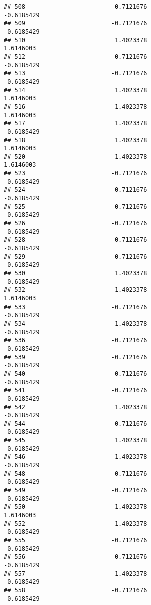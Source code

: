 \documentclass[
]{article}
\begin{document}
\begin{verbatim}
## 508                        -0.7121676                       -0.6185429
## 509                        -0.7121676                       -0.6185429
## 510                         1.4023378                        1.6146003
## 512                        -0.7121676                       -0.6185429
## 513                        -0.7121676                       -0.6185429
## 514                         1.4023378                        1.6146003
## 516                         1.4023378                        1.6146003
## 517                         1.4023378                       -0.6185429
## 518                         1.4023378                        1.6146003
## 520                         1.4023378                        1.6146003
## 523                        -0.7121676                       -0.6185429
## 524                        -0.7121676                       -0.6185429
## 525                        -0.7121676                       -0.6185429
## 526                        -0.7121676                       -0.6185429
## 528                        -0.7121676                       -0.6185429
## 529                        -0.7121676                       -0.6185429
## 530                         1.4023378                       -0.6185429
## 532                         1.4023378                        1.6146003
## 533                        -0.7121676                       -0.6185429
## 534                         1.4023378                       -0.6185429
## 536                        -0.7121676                       -0.6185429
## 539                        -0.7121676                       -0.6185429
## 540                        -0.7121676                       -0.6185429
## 541                        -0.7121676                       -0.6185429
## 542                         1.4023378                       -0.6185429
## 544                        -0.7121676                       -0.6185429
## 545                         1.4023378                       -0.6185429
## 546                         1.4023378                       -0.6185429
## 548                        -0.7121676                       -0.6185429
## 549                        -0.7121676                       -0.6185429
## 550                         1.4023378                        1.6146003
## 552                         1.4023378                       -0.6185429
## 555                        -0.7121676                       -0.6185429
## 556                        -0.7121676                       -0.6185429
## 557                         1.4023378                       -0.6185429
## 558                        -0.7121676                       -0.6185429

\end{verbatim}
\end{document}
